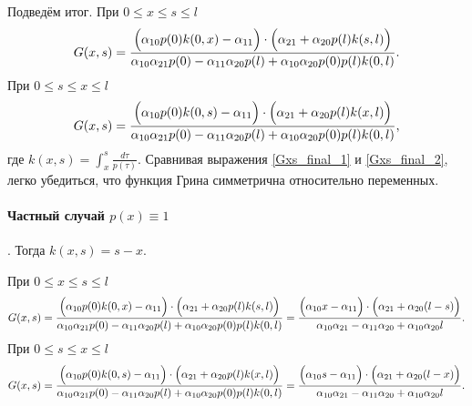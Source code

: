 \documentclass[a4paper,12pt]{article} %
\begin{document}
Подведём итог.
При $0 \leq x\leq s \leq l$
\begin{equation}\label{Gxs_final_1}
	G(x,s)
	=
	\frac{
		 \Bigl(\alpha_{10} p(0) k(0, x) - \alpha_{11}\Bigr) \cdot \Bigl(\alpha_{21} + \alpha_{20} p(l) k(s, l)\Bigr)
	}{
		\alpha_{10}\alpha_{21}p(0)  - \alpha_{11}\alpha_{20}p(l) + \alpha_{10}\alpha_{20} p(0) p(l) k(0,l)
	}
	.
\end{equation}
При $0 \leq s\leq x \leq l$
\begin{equation}\label{Gxs_final_2}
	G(x,s)
	=
	\frac{
		 \Bigl(\alpha_{10} p(0) k(0, s) - \alpha_{11}\Bigr) \cdot \Bigl(\alpha_{21} + \alpha_{20} p(l) k(x, l)\Bigr)
	}{
		\alpha_{10}\alpha_{21}p(0)  - \alpha_{11}\alpha_{20}p(l) + \alpha_{10}\alpha_{20} p(0) p(l) k(0,l)
	}
	,
\end{equation}
где $k(x,s) = \int_x^s \frac{d\tau}{p(\tau)}$.
Сравнивая выражения \eqref{Gxs_final_1} и \eqref{Gxs_final_2},
легко убедиться, что функция Грина симметрична относительно переменных.

\paragraph{Частный случай $p(x) \equiv 1$}.
Тогда $k(x,s) = s -x$.

При $0 \leq x\leq s \leq l$
\begin{equation}
	G(x,s)
	=
	\frac{
		 \Bigl(\alpha_{10} p(0) k(0, x) - \alpha_{11}\Bigr) \cdot \Bigl(\alpha_{21} + \alpha_{20} p(l) k(s, l)\Bigr)
	}{
		\alpha_{10}\alpha_{21}p(0)  - \alpha_{11}\alpha_{20}p(l) + \alpha_{10}\alpha_{20} p(0) p(l) k(0,l)
	}
	=
	\frac{
		 \Bigl(\alpha_{10} x - \alpha_{11}\Bigr) \cdot \Bigl(\alpha_{21} + \alpha_{20} (l-s)\Bigr)
	}{
		\alpha_{10}\alpha_{21}  - \alpha_{11}\alpha_{20} + \alpha_{10}\alpha_{20} l
	}
	.
\end{equation}
При $0 \leq s\leq x \leq l$
\begin{equation}
	G(x,s)
	=
	\frac{
		 \Bigl(\alpha_{10} p(0) k(0, s) - \alpha_{11}\Bigr) \cdot \Bigl(\alpha_{21} + \alpha_{20} p(l) k(x, l)\Bigr)
	}{
		\alpha_{10}\alpha_{21}p(0)  - \alpha_{11}\alpha_{20}p(l) + \alpha_{10}\alpha_{20} p(0) p(l) k(0,l)
	}
	=
	\frac{
		 \Bigl(\alpha_{10} s - \alpha_{11}\Bigr) \cdot \Bigl(\alpha_{21} + \alpha_{20} (l-x)\Bigr)
	}{
		\alpha_{10}\alpha_{21}  - \alpha_{11}\alpha_{20} + \alpha_{10}\alpha_{20} l
	}
	.
\end{equation}
\end{document}
